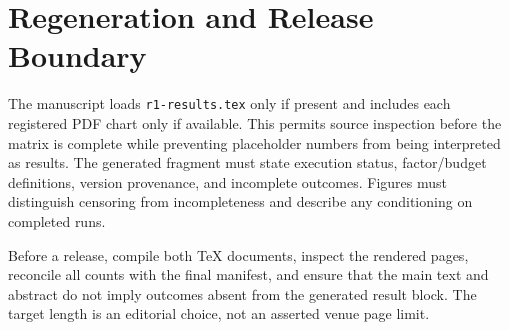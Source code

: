\documentclass[11pt]{article}
\begin{document}
\section{Regeneration and Release Boundary}
The manuscript loads \texttt{r1-results.tex} only if present and includes each registered PDF chart only if available. This permits source inspection before the matrix is complete while preventing placeholder numbers from being interpreted as results. The generated fragment must state execution status, factor/budget definitions, version provenance, and incomplete outcomes. Figures must distinguish censoring from incompleteness and describe any conditioning on completed runs.

Before a release, compile both TeX documents, inspect the rendered pages, reconcile all counts with the final manifest, and ensure that the main text and abstract do not imply outcomes absent from the generated result block. The target length is an editorial choice, not an asserted venue page limit.
\end{document}
